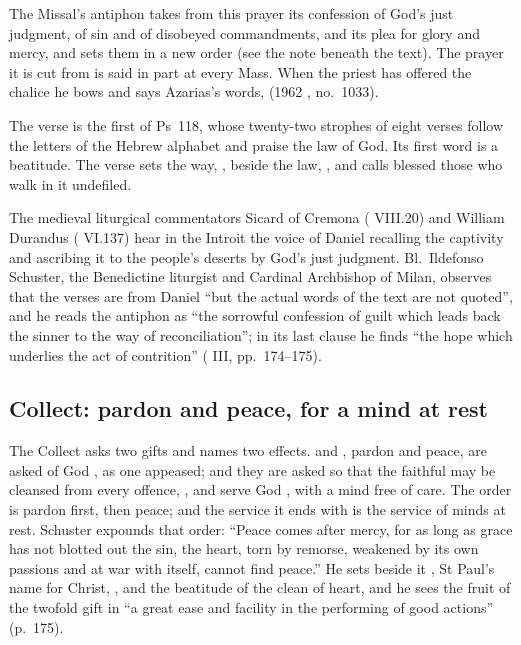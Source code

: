 The Missal's antiphon takes from this prayer its confession of God's just
judgment, of sin and of disobeyed commandments, and its plea for glory and
mercy, and sets them in a new order (see the note beneath the text). The prayer
it is cut from is said in part at every Mass. When the priest has offered the
chalice he bows and says Azarias's words,  (1962 ,
no.~1033).

The verse is the first of Ps~118, whose twenty-two strophes of eight verses
follow the letters of the Hebrew alphabet and praise the law of God. Its
first word is a beatitude. The verse sets the way, , beside the law, , and calls blessed those who walk
in it undefiled.

The medieval liturgical commentators Sicard of Cremona (
VIII.20) and William Durandus ( VI.137) hear in the Introit
the voice of Daniel recalling the captivity and ascribing it to the people's
deserts by God's just judgment. Bl.\ Ildefonso Schuster, the Benedictine
liturgist and Cardinal Archbishop of Milan, observes that the verses are from
Daniel ``but the actual words of the text are not quoted'', and he reads the
antiphon as ``the sorrowful confession of guilt which leads back the sinner to
the way of reconciliation''; in its last clause he finds ``the hope which
underlies the act of contrition'' ( III, pp.~174--175).

\subsection{Collect: pardon and peace, for a mind at rest}

The Collect asks two gifts and names two effects.  and
, pardon and peace, are asked of God , as one
appeased; and they are asked so that the faithful may be cleansed from every
offence, , and serve God , with a mind free of care. The order is pardon first, then peace; and
the service it ends with is the service of minds at rest. Schuster expounds
that order: ``Peace comes after mercy, for as long as grace has not blotted out
the sin, the heart, torn by remorse, weakened by its own passions and at war
with itself, cannot find peace.'' He sets beside it ,
St Paul's name for Christ, , and the beatitude of the clean
of heart, and he sees the fruit of the twofold gift in ``a great ease and
facility in the performing of good actions'' (p.~175).

